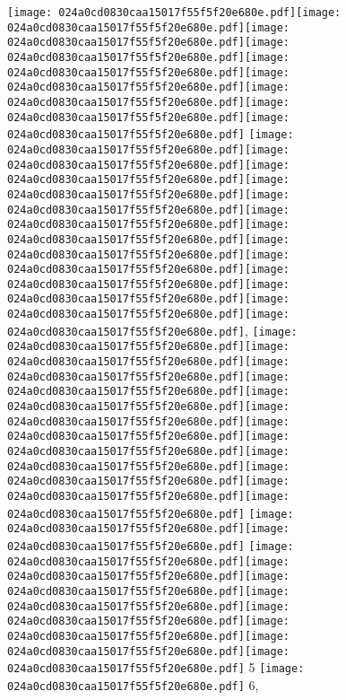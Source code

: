 \documentclass{article}
\newcommand{\origpg}[2]{\texttt{[image: 024a0cd0830caa15017f55f5f20e680e.pdf]}}
\begin{document}
{\fontsize{16.14pt}{19.368pt}\selectfont{}

\vspace*{-19.368pt}\hspace{35.438pt}\origpg{11}{120.74pt 773.51pt 131.51pt 789.65pt}\origpg{11}{131.57pt 773.51pt 139.64pt 789.65pt}\hspace{-0.113pt}\origpg{11}{139.53pt 773.51pt 146.69pt 789.65pt}\origpg{11}{146.74pt 773.51pt 154.36pt 789.65pt}\origpg{11}{154.44pt 773.51pt 163.08pt 789.65pt}\hspace{-0.21pt}\origpg{11}{162.87pt 773.51pt 171.5pt 789.65pt}\origpg{11}{171.5pt 773.51pt 179.12pt 789.65pt}\hspace{-0.355pt}\origpg{11}{178.77pt 773.51pt 185.93pt 789.65pt}\origpg{11}{185.98pt 773.51pt 193.4pt 789.65pt} \origpg{11}{200.43pt 773.51pt 208.5pt 789.65pt}\origpg{11}{208.59pt 773.51pt 215.76pt 789.65pt}\hspace{-0.178pt}\origpg{11}{215.58pt 773.51pt 222.75pt 789.65pt}\origpg{11}{222.8pt 773.51pt 231.43pt 789.65pt}\hspace{-0.21pt}\origpg{11}{231.22pt 773.51pt 239.29pt 789.65pt}\origpg{11}{239.39pt 773.51pt 246.55pt 789.65pt}\hspace{-0.42pt}\origpg{11}{246.14pt 773.51pt 254.35pt 789.65pt}\origpg{11}{254.35pt 773.51pt 261.52pt 789.65pt}\hspace{-0.21pt}\origpg{11}{261.31pt 773.51pt 269.36pt 789.65pt}\origpg{11}{269.26pt 773.51pt 276.43pt 789.65pt}\hspace{-0.178pt}\origpg{11}{276.25pt 773.51pt 284.89pt 789.65pt}\origpg{11}{284.89pt 773.51pt 293.52pt 789.65pt}\origpg{11}{293.59pt 773.51pt 301.01pt 789.65pt}, \origpg{11}{312.34pt 773.51pt 320.98pt 789.65pt}\origpg{11}{320.98pt 773.51pt 327.35pt 789.65pt}\origpg{11}{327.27pt 773.51pt 335.34pt 789.65pt}\hspace{-0.113pt}\origpg{11}{335.23pt 773.51pt 343.44pt 789.65pt}\origpg{11}{343.44pt 773.51pt 351.52pt 789.65pt}\hspace{-0.145pt}\origpg{11}{351.37pt 773.51pt 358.54pt 789.65pt}\hspace{-0.178pt}\origpg{11}{358.36pt 773.51pt 369.51pt 789.65pt}\hspace{-0.307pt}\origpg{11}{369.2pt 773.51pt 376.37pt 789.65pt}\hspace{-0.178pt}\origpg{11}{376.19pt 773.51pt 384.83pt 789.65pt}\origpg{11}{384.83pt 773.51pt 393.46pt 789.65pt}\origpg{11}{393.53pt 773.51pt 404.37pt 789.65pt}\origpg{11}{404.37pt 773.51pt 411.54pt 789.65pt} \origpg{11}{418.56pt 773.51pt 427.2pt 789.65pt}\origpg{11}{427.2pt 773.51pt 434.36pt 789.65pt} \origpg{11}{441.42pt 773.51pt 449.49pt 789.65pt}\origpg{11}{449.58pt 773.51pt 458.22pt 789.65pt}\origpg{11}{458.22pt 773.51pt 465.38pt 789.65pt}\hspace{-0.145pt}\origpg{11}{465.24pt 773.51pt 473.31pt 789.65pt}\hspace{-0.355pt}\origpg{11}{472.95pt 773.51pt 481.59pt 789.65pt}\origpg{11}{481.59pt 773.51pt 489.43pt 789.65pt}\origpg{11}{489.34pt 773.51pt 496.5pt 789.65pt}\origpg{11}{496.55pt 773.51pt 504.62pt 789.65pt} 5 \origpg{11}{526.62pt 773.51pt 535.26pt 789.65pt} 6, 

}
\end{document}
